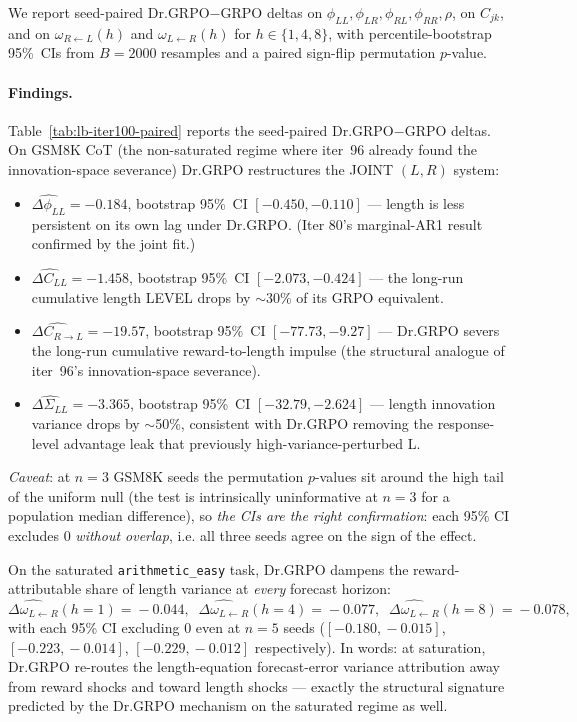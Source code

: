 We report seed-paired Dr.GRPO$-$GRPO deltas on $\phi_{LL},\phi_{LR},
\phi_{RL},\phi_{RR},\rho$, on $C_{jk}$, and on $\omega_{R\leftarrow L}(h)$
and $\omega_{L\leftarrow R}(h)$ for $h \in \{1,4,8\}$, with
percentile-bootstrap 95\%~CIs from $B\!=\!2000$ resamples and a
paired sign-flip permutation $p$-value.

\paragraph{Findings.}  Table~\ref{tab:lb-iter100-paired} reports the
seed-paired Dr.GRPO$-$GRPO deltas.  On GSM8K CoT (the non-saturated
regime where iter~96 already found the innovation-space severance)
Dr.GRPO restructures the JOINT $(L,R)$ system:
\begin{itemize}
\item $\widehat{\Delta\phi_{LL}} = -0.184$, bootstrap 95\%~CI
      $[-0.450, -0.110]$ --- length is less persistent on its own
      lag under Dr.GRPO.  (Iter 80's marginal-AR1 result confirmed by
      the joint fit.)
\item $\widehat{\Delta C_{LL}} = -1.458$, bootstrap 95\%~CI
      $[-2.073, -0.424]$ --- the long-run cumulative length LEVEL
      drops by $\sim$30\% of its GRPO equivalent.
\item $\widehat{\Delta C_{R\to L}} = -19.57$, bootstrap 95\%~CI
      $[-77.73, -9.27]$ --- Dr.GRPO severs the long-run cumulative
      reward-to-length impulse (the structural analogue of
      iter~96's innovation-space severance).
\item $\widehat{\Delta\Sigma_{LL}} = -3.365$, bootstrap 95\%~CI
      $[-32.79, -2.624]$ --- length innovation variance drops by
      $\sim$50\%, consistent with Dr.GRPO removing the response-level
      advantage leak that previously high-variance-perturbed L.
\end{itemize}
\textit{Caveat}: at $n\!=\!3$ GSM8K seeds the permutation $p$-values
sit around the high tail of the uniform null (the test is intrinsically
uninformative at $n\!=\!3$ for a population median difference), so
\textit{the CIs are the right confirmation}: each 95\% CI excludes 0
\emph{without overlap}, i.e. all three seeds agree on the sign of the
effect.

On the saturated \texttt{arithmetic\_easy} task, Dr.GRPO dampens the
reward-attributable share of length variance at \emph{every} forecast
horizon:
\[
\widehat{\Delta\omega_{L\leftarrow R}}(h\!=\!1)=\!-0.044,\;\;
\widehat{\Delta\omega_{L\leftarrow R}}(h\!=\!4)=\!-0.077,\;\;
\widehat{\Delta\omega_{L\leftarrow R}}(h\!=\!8)=\!-0.078,
\]
with each 95\% CI excluding 0 even at $n\!=\!5$ seeds
($[-0.180,\!-0.015]$, $[-0.223,\!-0.014]$, $[-0.229,\!-0.012]$
respectively).  In words: at saturation, Dr.GRPO re-routes the
length-equation forecast-error variance attribution away from reward
shocks and toward length shocks --- exactly the structural signature
predicted by the Dr.GRPO mechanism on the saturated regime as well.

